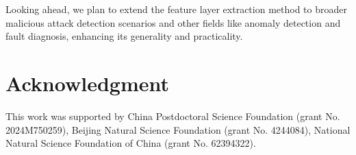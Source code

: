 \documentclass[conference]{IEEEtran}
\begin{document}

Looking ahead, we plan to extend the feature layer extraction method to broader malicious attack detection scenarios and other fields like anomaly detection and fault diagnosis, enhancing its generality and practicality.




\section{Acknowledgment}

This work was supported by China Postdoctoral Science Foundation (grant No. 2024M750259), Beijing Natural Science Foundation (grant No. 4244084), National Natural Science Foundation of China (grant No. 62394322).







\end{document}
